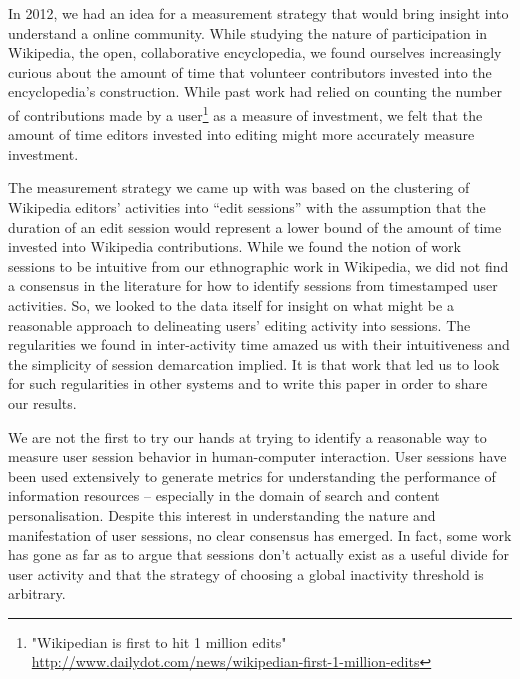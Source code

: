 In 2012, we had an idea for a measurement strategy that would bring insight into understand a online community.  While studying the nature of participation in Wikipedia, the open, collaborative encyclopedia, we found ourselves increasingly curious about the amount of time that volunteer contributors invested into the encyclopedia's construction.  While past work had relied on counting the number of contributions made by a user\footnote{"Wikipedian is first to hit 1 million edits" \url{http://www.dailydot.com/news/wikipedian-first-1-million-edits}} as a measure of investment, we felt that the amount of time editors invested into editing might more accurately measure investment.

The measurement strategy we came up with was based on the clustering of Wikipedia editors' activities into ``edit sessions'' with the assumption that the duration of an edit session would represent a lower bound of the amount of time invested into Wikipedia contributions\cite{geiger2013using}.  While we found the notion of work sessions to be intuitive from our ethnographic work in Wikipedia, we did not find a consensus in the literature for how to identify sessions from timestamped user activities.  So, we looked to the data itself for insight on what might be a reasonable approach to delineating users' editing activity into sessions. The regularities we found in inter-activity time amazed us with their intuitiveness and the simplicity of session demarcation implied. It is that work that led us to look for such regularities in other systems and to write this paper in order to share our results.

We are not the first to try our hands at trying to identify a reasonable way to measure user session behavior in human-computer interaction.  User sessions have been used extensively to generate metrics for understanding the performance of information resources\cite{govseva2006empirical} -- especially in the domain of search\cite{donato2010you}\cite{eickhoff2014lessons} and content personalisation\cite{spiliopoulou2003framework,gomory1999analysis}. Despite this interest in understanding the nature and manifestation of user sessions, no clear consensus has emerged.  In fact, some work has gone as far as to argue that sessions don't actually exist as a useful divide for user activity\cite{jones2008beyond} and that the strategy of choosing a global inactivity threshold is arbitrary\cite{montgomery2001identifying}.

